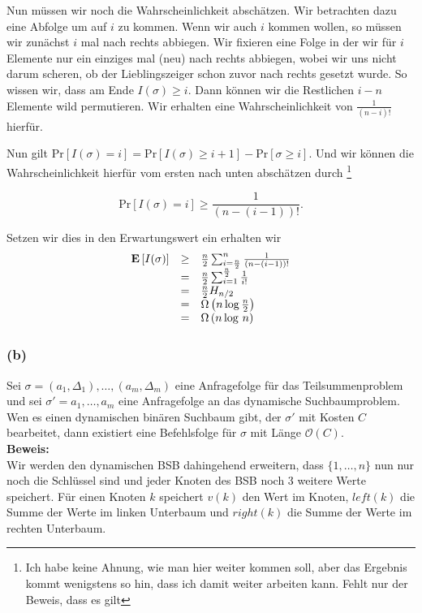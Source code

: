 \documentclass[11pt,a4paper,ngerman]{article}
\newcommand{\erw}[1]{\text{\bfseries E} \left[ #1 \right]}
\newcommand{\prob}[1]{\text{Pr}\left[ #1 \right]}
\begin{document}
Nun müssen wir noch die Wahrscheinlichkeit abschätzen. Wir betrachten dazu eine Abfolge um auf $i$ zu kommen. Wenn wir auch $i$ kommen
wollen, so müssen wir zunächst $i$ mal nach rechts abbiegen. Wir fixieren eine Folge in der wir für $i$ Elemente nur ein einziges mal (neu) nach rechts abbiegen, wobei wir uns nicht darum scheren, ob der Lieblingszeiger schon zuvor nach rechts gesetzt wurde. So wissen wir, dass am Ende
$I(\sigma) \geq i$. Dann können wir die Restlichen $i-n$ Elemente wild permutieren. Wir erhalten eine
Wahrscheinlichkeit von $\frac{1}{(n-i)!}$ hierfür.

Nun gilt $\prob{I(\sigma) = i} = \prob{I(\sigma) \geq i+1} -  \prob{\sigma \geq i}$. Und wir können die Wahrscheinlichkeit hierfür vom
ersten nach unten abschätzen durch \footnote{Ich habe keine Ahnung, wie man hier weiter kommen soll, aber das Ergebnis
kommt wenigstens so hin, dass ich damit weiter arbeiten kann. Fehlt nur der Beweis, dass es gilt}

$$\prob{I(\sigma) = i} \geq \frac{1}{(n- (i-1))!}.$$

Setzen wir dies in den Erwartungswert ein erhalten wir
$$\begin{array}{rcl}
	\erw{I(\sigma)} &\geq& \frac{n}{2} \sum_{i=\frac{n}{2}}^n  \frac{1}{(n-(i-1))!}\\
		&=& \frac{n}{2} \sum_{i=1}^{\frac{n}{2}} \frac{1}{i!}\\
		&=& \frac{n}{2} H_{n/2}\\
		&=& \Omega \left(n \log \frac{n}{2} \right)\\
		&=& \Omega \left( n \log \, n \right)
\end{array}$$


\subsubsection*{(b)} Sei $\sigma = (a_1, \Delta_1), \ldots, (a_m, \Delta_m)$ eine Anfragefolge für das Teilsummenproblem und sei $\sigma' = a_1, \ldots, a_m$ eine Anfragefolge an das dynamische Suchbaumproblem. Wen es einen dynamischen binären Suchbaum gibt, der $\sigma'$ mit Kosten $C$ bearbeitet, dann existiert eine Befehlsfolge für $\sigma$ mit Länge $\mathcal{O}(C)$.\\

\noindent\textbf{Beweis:}\\

Wir werden den dynamischen BSB dahingehend erweitern, dass $\{1, \ldots, n\}$ nun nur noch die Schlüssel sind und jeder Knoten des BSB
noch 3 weitere Werte speichert. Für einen Knoten $k$ speichert $v(k)$ den Wert im Knoten, $left(k)$ die Summe der Werte im linken Unterbaum
und $right(k)$ die Summe der Werte im rechten Unterbaum.\\
\end{document}
